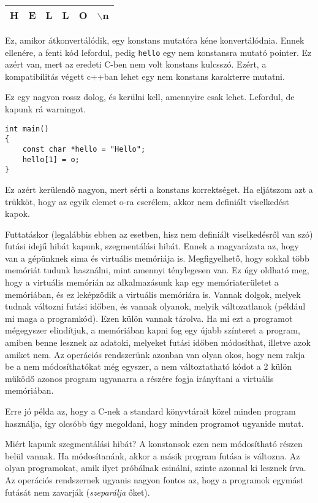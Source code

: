 \documentclass[a4paper,11.5pt]{article}
\begin{document}
	\begin{center}
		\begin{tabular}{|c|c|c|c|c|c|}
			\hline
			H&E&L&L&O&$\backslash$n\\
			\hline
		\end{tabular}
	\end{center}
	Ez, amikor átkonvertálódik, egy konstans mutatóra kéne konvertálódnia. Ennek ellenére, a fenti kód lefordul, pedig \texttt{hello} egy nem konstansra mutató pointer. Ez azért van, mert az eredeti C-ben nem volt konstans kulcsszó. Ezért, a kompatibilitás végett c++ban lehet egy nem konstans karakterre mutatni. 
	\begin{note}
		Ez egy nagyon rossz dolog, és kerülni kell, amennyire csak lehet. Lefordul, de kapunk rá warningot.
	\end{note}
	\begin{lstlisting}
int main()
{
	const char *hello = "Hello";
	hello[1] = o;
}
	\end{lstlisting}
	Ez azért kerülendő nagyon, mert sérti a konstans korrektséget. Ha eljátszom azt a trükköt, hogy az egyik elemet o-ra cserélem, akkor nem definiált viselkedést kapok. 
	
	Futtatáskor (legalábbis ebben az esetben, hisz nem definiált viselkedésről van szó) futási idejű hibát kapunk, szegmentálási hibát. Ennek a magyarázata az, hogy van a gépünknek sima és virtuális memóriája is. Megfigyelhető, hogy sokkal több memóriát tudunk használni, mint amennyi ténylegesen van. Ez úgy oldható meg, hogy a virtuális memórián az alkalmazásunk kap egy memóriaterületet a memóriában, és ez leképződik a virtuális memóriára is. Vannak dolgok, melyek tudnak változni futási időben, és vannak olyanok, melyik változatlanok (például mi maga a programkód). Ezen külön vannak tárolva. Ha mi ezt a programot mégegyszer elindítjuk, a memóriában kapni fog egy újabb színteret a program, amiben benne lesznek az adatoki, melyeket futási időben módosíthat, illetve azok amiket nem. Az operációs rendszerünk azonban van olyan okos, hogy nem rakja be a nem módosíthatókat még egyszer, a nem változtatható kódot a 2 külön működő azonos program ugyanarra a részére fogja irányítani a virtuális memóriában.
	
	\medskip
	Erre jó példa az, hogy a C-nek a standard könyvtárait közel minden program használja, így olcsóbb úgy megoldani, hogy minden programot ugyanide mutat.
	
	\medskip
	Miért kapunk szegmentálási hibát? A konstansok ezen nem módosítható részen belül vannak. Ha módosítanánk, akkor a másik program futása is változna. Az olyan programokat, amik ilyet próbálnak csinálni, szinte azonnal ki lesznek írva. Az operációs rendszernek ugyanis nagyon fontos az, hogy a programok egymást futását nem zavarják (\textit{szeparálja} őket).
	
\end{document}
